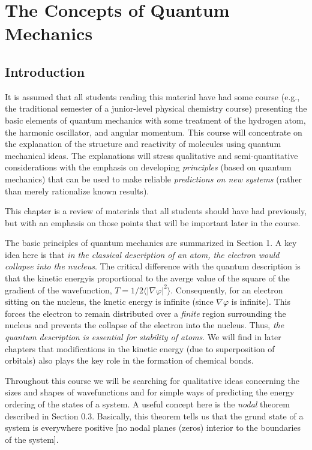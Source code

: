 \chapter{The Concepts of Quantum Mechanics}
\label{chap01}

\section{Introduction}

It is assumed that all students reading this material have had some 
course (e.g., the traditional semester of a junior-level physical 
chemistry course) presenting the basic elements of quantum mechanics 
with some treatment of the hydrogen atom, the harmonic oscillator, 
and angular momentum.  This course will concentrate on the 
explanation of the structure and reactivity of molecules using 
quantum mechanical ideas.  The explanations will stress qualitative 
and semi-quantitative considerations with the emphasis on developing 
\emph{principles} (based on quantum mechanics) that can be used to make 
reliable \emph{predictions on new systems} (rather than merely 
rationalize known results).

This chapter is a review of materials that all students should have
had previously, but with an emphasis on those points that will be
important later in the course.

The basic principles of quantum mechanics are summarized in Section 1.
A key idea here is that \emph{in the classical description of an atom,
  the electron would collapse into the nucleus}.  The critical
difference with the quantum description is that the kinetic energyis
proportional to the averge value of the square of the gradient of the
wavefunction, $T = 1/2 \langle | \nabla \varphi |^2\rangle$.
Consequently, for an electron sitting on the nucleus, the knetic
energy is infinite (since $\nabla \varphi$ is infinite).  This forces
the electron to remain distributed over a \emph{finite} region
surrounding the nucleus and prevents the collapse of the electron into
the nucleus.  Thus, \emph{the quantum description is essential for
  stability of atoms}.  We will find in later chapters that
modifications in the kinetic energy (due to superposition of orbitals)
also plays the key role in the formation of chemical bonds.

Throughout this course we will be searching for qualitative ideas 
concerning the sizes and shapes of wavefunctions and for simple ways 
of predicting the energy ordering of the states of a system.  A useful 
concept here is the \emph{nodal} theorem described in Section 0.3.  
Basically, this theorem tells us that the grund state of a system is 
everywhere positive [no nodal planes (zeros) interior to the boundaries 
of the system].

